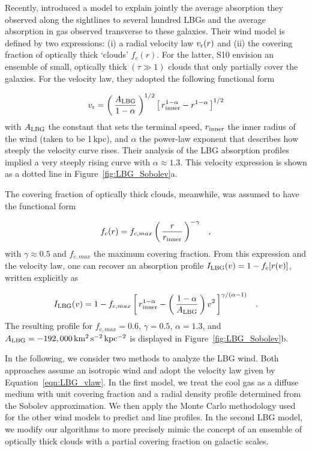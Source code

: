 \documentclass[12pt,preprint]{aastex}
\begin{document}
Recently, \citet[][hereafter S10]{steidel+10} introduced a model to
explain jointly the average absorption they observed
along the sightlines to several hundred LBGs and the average absorption in gas
observed transverse to these galaxies.  
Their wind model is defined by two
expressions: (i) a radial velocity law $v_{\rm r}(r)$ and (ii) the covering
fraction of optically thick `clouds' $f_c(r)$.  For the latter, S10
envision an 
ensemble of small, optically thick $(\tau \gg 1)$ clouds that only
partially cover the galaxies.
For the velocity law, they adopted the following functional
form

\begin{equation}
v_{\rm r} = \left ( \, \frac{A_{\rm LBG}}{1-\alpha} \, \right )^{1/2} \left [ \, r_{\rm
  inner}^{1-\alpha} - r^{1-\alpha} \, \right ]^{1/2}
\label{eqn:LBG_vlaw}
\end{equation}
with $A_{\rm LBG}$ the constant that sets the terminal speed,
$r_{\rm inner}$ the inner radius of the wind (taken to be 1\,kpc), and
$\alpha$ the power-law exponent that describes how steeply the velocity curve rises.  Their
analysis of the LBG absorption profiles implied
a very steeply rising curve with $\alpha \approx 1.3$.
This velocity expression is shown as a dotted line in 
Figure~\ref{fig:LBG_Sobolev}a.  

The covering fraction of optically thick clouds, meanwhile, was assumed to have
the functional form

\begin{equation}
f_c(r) = f_{c,max} \left ( \, \frac{r}{r_{\rm inner}} \, \right )^{-\gamma} \;\;\; ,
\label{eqn:covering}
\end{equation}
with $\gamma \approx 0.5$ and $f_{c,max}$ the maximum covering
fraction.  From this expression and the velocity law, one can recover
an absorption profile $I_{\rm LBG}(v) = 1 - f_c[r(v)]$, written
explicitly as

\begin{equation}
I_{\rm LBG}(v) = 1 - f_{c,max} \left [ \, r_{\rm inner}^{1-\alpha} - \left ( \,
\frac{1-\alpha}{A_{\rm LBG}} \, \right ) v^2 \, \right ]^{\gamma/(\alpha-1)}
\;\;\; .
\label{eqn:LBG_I}
\end{equation}
The resulting profile for $f_{c,max} = 0.6$, $\gamma=0.5$,
$\alpha=1.3$, and $A_{\rm LBG} = -192,000 \, \rm km^2 \, s^{-2} \, kpc^{-2}$ 
is displayed in Figure~\ref{fig:LBG_Sobolev}b.  

In the following, we consider two methods to analyze the LBG wind.
Both approaches assume an isotropic wind and adopt the velocity law given by
Equation~\ref{eqn:LBG_vlaw}.  In the first model, we treat the cool gas as a
diffuse medium with unit covering fraction and a radial density
profile determined from the Sobolev approximation.  We then apply 
the Monte Carlo methodology used for the other wind models to predict
 and  line profiles.  In the second LBG model,
we modify our algorithms to more precisely mimic the concept of an
ensemble of optically thick clouds with a partial covering fraction on
galactic scales.
\end{document}
